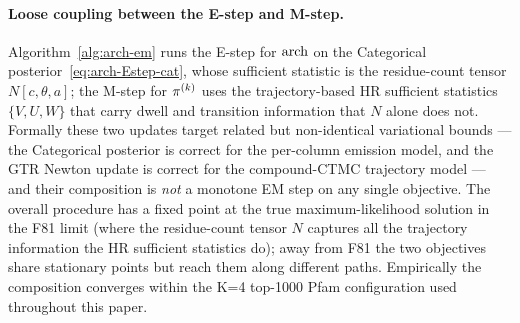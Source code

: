 \paragraph{Loose coupling between the E-step and M-step.}
Algorithm~\ref{alg:arch-em} runs the E-step for $\mathrm{arch}$ on the
Categorical posterior~\eqref{eq:arch-Estep-cat}, whose sufficient
statistic is the residue-count tensor $N[c, \theta, a]$; the M-step for
$\pi^{(k)}$ uses the trajectory-based HR sufficient statistics
$\{V, U, W\}$ that carry dwell and transition information that $N$
alone does not. Formally these two updates target related but
non-identical variational bounds --- the Categorical posterior is
correct for the per-column emission model, and the GTR Newton update
is correct for the compound-CTMC trajectory model --- and their
composition is \emph{not} a monotone EM step on any single objective.
The overall procedure has a fixed point at the true maximum-likelihood
solution in the F81 limit (where the residue-count tensor $N$ captures
all the trajectory information the HR sufficient statistics do); away
from F81 the two objectives share stationary points but reach them
along different paths. Empirically the composition converges within
the K=4 top-1000 Pfam configuration used throughout this paper.

